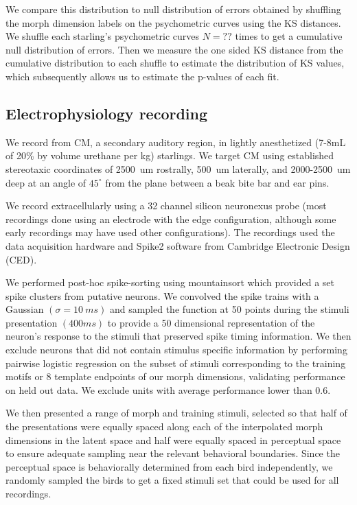 We compare this distribution to null distribution of errors obtained by shuffling the morph dimension labels on the psychometric curves using the \ac{KS} distances. We shuffle each starling's psychometric curves $N=??$ times to get a cumulative null distribution of errors. Then we measure the one sided KS distance from the cumulative distribution to each shuffle to estimate the distribution of KS values, which subsequently allows us to estimate the p-values of each fit.

\subsection{Electrophysiology recording}

We record from \ac{CM}, a secondary auditory region, in lightly anesthetized (7-8mL of 20\% by volume urethane per kg) starlings. We target \ac{CM} using established stereotaxic coordinates of \SI{2500}{um} rostrally, \SI{500}{um} laterally, and 2000-\SI{2500}{um} deep at an angle of $45^\circ$ from the plane between a beak bite bar and ear pins. 

We record extracellularly using a 32 channel silicon neuronexus probe (most recordings done using an electrode with the edge configuration, although some early recordings may have used other configurations). The recordings used the data acquisition hardware and Spike2 software from Cambridge Electronic Design (CED).

We performed post-hoc spike-sorting using mountainsort\cite{mountainsort} which provided a set spike clusters from putative neurons. We convolved the spike trains with a Gaussian $(\sigma=\SI{10}{ms})$ and sampled the function at 50 points during the stimuli presentation $(400 ms)$ to provide a 50 dimensional representation of the neuron's response to the stimuli that preserved spike timing information. We then exclude neurons that did not contain stimulus specific information by performing pairwise logistic regression on the subset of stimuli corresponding to the training motifs or 8 template endpoints of our morph dimensions, validating performance on held out data. We exclude units with average performance lower than 0.6.

We then presented a range of morph and training stimuli, selected so that half of the presentations were equally spaced along each of the interpolated morph dimensions in the latent space and half were equally spaced in perceptual space to ensure adequate sampling near the relevant behavioral boundaries. Since the perceptual space is behaviorally determined from each bird independently, we randomly sampled the birds to get a fixed stimuli set that could be used for all recordings.


